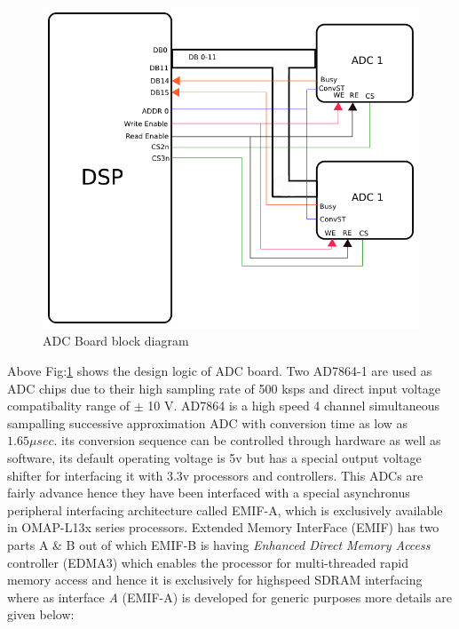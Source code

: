 \begin{figure}[ht]
\includegraphics[width=\columnwidth]{fig/ADC_board.png}
\caption{ADC Board block diagram}
\label{fig:adc_board}
\end{figure}
Above Fig:\ref{fig:adc_board} shows the design logic of ADC board. Two AD7864-1 are used as ADC chips due to their high sampling rate of 500 ksps and direct input voltage compatibality range of $\pm$ 10 V. AD7864 is a high speed 4 channel simultaneous sampalling successive approximation ADC with conversion time as low as $1.65 \mu sec$. its conversion sequence can be controlled through hardware as well as software, its default operating voltage is 5v but has a special output voltage shifter for interfacing it with 3.3v processors and controllers. This ADCs are fairly advance hence they have been interfaced with a special asynchronus peripheral interfacing architecture called EMIF-A, which is exclusively available in OMAP-L13x series processors. Extended Memory InterFace (EMIF) has two parts A \& B out of which EMIF-B is having \textit{Enhanced Direct Memory Access} controller (EDMA3) which enables the processor for multi-threaded rapid memory access and hence it is exclusively for highspeed SDRAM interfacing where as interface \textit{A} (EMIF-A) is developed for generic purposes more details are given below:

